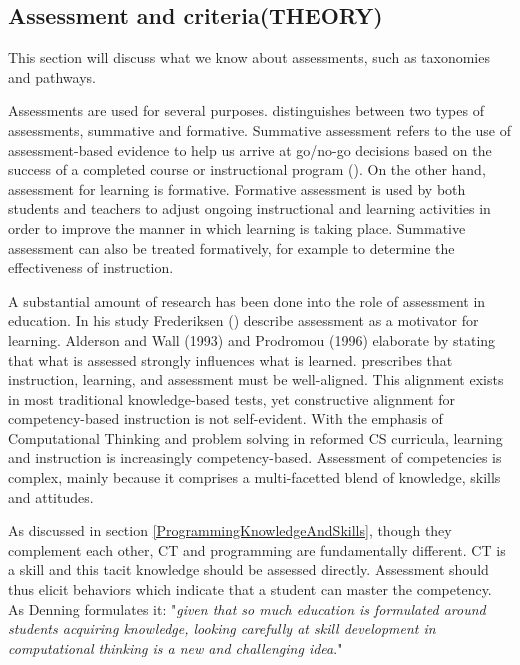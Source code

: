 




\subsection{Assessment and criteria(THEORY)}
This section will discuss what we know about assessments, such as taxonomies and pathways.


Assessments are used for several purposes.  distinguishes between two types of assessments, summative and formative. Summative assessment refers to the use of assessment-based evidence to help us arrive at go/no-go decisions based on the success of a completed course or instructional program (\cite{popham2009assessment}). On the other hand, assessment for learning is formative. Formative assessment is used by both students and teachers to adjust ongoing instructional and learning activities in order to improve the manner in which learning is taking place. Summative assessment can also be treated formatively, for example to determine the effectiveness of instruction.




A substantial amount of research has been done into the role of assessment in education. In his study Frederiksen (\cite{frederiksen1984}) describe assessment as a motivator for learning. Alderson and Wall (1993) and Prodromou (1996) elaborate by stating that what is assessed strongly influences what is learned.  prescribes that instruction, learning, and assessment must be well-aligned. This alignment exists in most traditional knowledge-based tests, yet constructive alignment for competency-based instruction is not self-evident\cite{baartman2006wheel}. With the emphasis of Computational Thinking and problem solving in reformed CS curricula, learning and instruction is increasingly competency-based. Assessment of competencies is complex, mainly because it comprises a multi-facetted blend of knowledge, skills and attitudes\cite{merrienboer2002competenties}.


As discussed in section \ref{ProgrammingKnowledgeAndSkills}, though they complement each other, CT and programming are fundamentally different. CT is a skill and this tacit knowledge should be assessed directly\cite{denning2017remaining}. Assessment should thus elicit behaviors which indicate that a student can master the competency. As Denning formulates it: "\emph{given that so much education is formulated around students acquiring knowledge, looking carefully at skill development in computational thinking is a new and challenging idea}."\cite{denning2017remaining}




